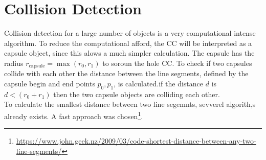 \section{Collision Detection}
% 
Collision detection for a large number of objects is a very computational intense algorithm.
To reduce the computational afford, the \ac{CC} will be interpreted as a capsule object, since this alows a much simpler calculation. The capsule has the radius $r_{\text{capsule}} = \max(r_0, r_1)$ to soroun the hole \ac{CC}. To check if two capsules collide with each other the distance between the line segments, defined by the capsule begin and end points $p_0, p_1$, is calculated.if the distance $d$ is $d < (r_0 + r_1)$ then the two capsule objects are colliding each other. \\
% 
To calculate the smallest distance between two line segemnts, sevverel algorith,s already exists. A fast approach was chosen\footnote{\href{https://www.john.geek.nz/2009/03/code-shortest-distance-between-any-two-line-segments/}{https://www.john.geek.nz/2009/03/code-shortest-distance-between-any-two-line-segments/}}.
%
